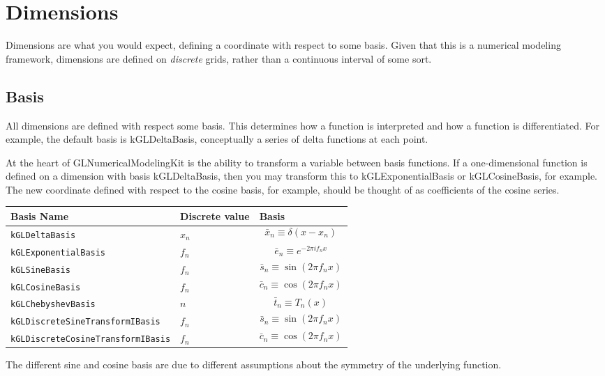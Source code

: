 \documentclass[11pt]{article}
\begin{document}
%
%
\section{Dimensions}

Dimensions are what you would expect, defining a coordinate with respect to some basis. Given that this is a numerical modeling framework, dimensions are defined on \emph{discrete} grids, rather than a continuous interval of some sort.

\subsection{Basis}

All dimensions are defined with respect some basis. This determines how a function is interpreted and how a function is differentiated. For example, the default basis is kGLDeltaBasis, conceptually a series of delta functions at each point.

At the heart of GLNumericalModelingKit is the ability to transform a variable between basis functions. If a one-dimensional function is defined on a dimension with basis kGLDeltaBasis, then you may transform this to kGLExponentialBasis or kGLCosineBasis, for example. The new coordinate defined with respect to the cosine basis, for example, should be thought of as coefficients of the cosine series. 

\begin{tabular}{llL}
      \hline
      Basis Name & Discrete value & Basis \tabularnewline \hline \hline
      \verb"kGLDeltaBasis" & $x_n$ &\[  \bar{x}_n \equiv  \delta( x - x_n) \] \tabularnewline
      \verb"kGLExponentialBasis" & $f_n$  & \[ \bar{e}_n \equiv e^{-2\pi i f_n x} \] \tabularnewline
      \verb"kGLSineBasis" & $f_n$ & \[ \bar{s}_n \equiv \sin( 2 \pi f_n x )\] \tabularnewline
      \verb"kGLCosineBasis" & $f_n$ & \[  \bar{c}_n \equiv \cos ( 2 \pi f_n x )\] \tabularnewline
      \verb"kGLChebyshevBasis"& $n$ & \[ \bar{t}_n \equiv  T_n(x) \] \tabularnewline 
             \verb"kGLDiscreteSineTransformIBasis" & $f_n$ & \[ \bar{s}_n \equiv \sin ( 2 \pi f_n x )\] \tabularnewline
      \verb"kGLDiscreteCosineTransformIBasis"&$f_n$ & \[ \bar{c}_n \equiv \cos ( 2 \pi f_n x ) \] \tabularnewline 
      \hline
\end{tabular}

The different sine and cosine basis are due to different assumptions about the symmetry of the underlying function.
\end{document}
